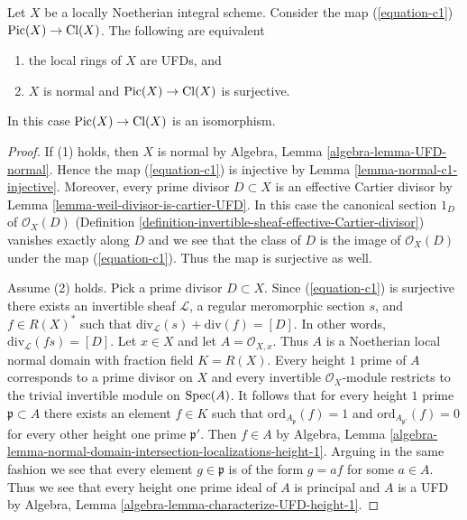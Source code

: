 \begin{lemma}
\label{lemma-local-rings-UFD-c1-bijective}
Let $X$ be a locally Noetherian integral scheme. Consider the map
(\ref{equation-c1}) $\mathop{\mathrm{Pic}}\nolimits(X) \to \text{Cl}(X)$.
The following are equivalent
\begin{enumerate}
\item the local rings of $X$ are UFDs, and
\item $X$ is normal and $\mathop{\mathrm{Pic}}\nolimits(X) \to \text{Cl}(X)$
is surjective.
\end{enumerate}
In this case $\mathop{\mathrm{Pic}}\nolimits(X) \to \text{Cl}(X)$ is an isomorphism.
\end{lemma}

\begin{proof}
If (1) holds, then $X$ is normal by
Algebra, Lemma \ref{algebra-lemma-UFD-normal}.
Hence the map (\ref{equation-c1}) is injective by
Lemma \ref{lemma-normal-c1-injective}. Moreover,
every prime divisor $D \subset X$ is an effective
Cartier divisor by Lemma \ref{lemma-weil-divisor-is-cartier-UFD}.
In this case the canonical section $1_D$ of $\mathcal{O}_X(D)$
(Definition \ref{definition-invertible-sheaf-effective-Cartier-divisor})
vanishes exactly along $D$ and we see that the class of $D$ is the
image of $\mathcal{O}_X(D)$ under the map (\ref{equation-c1}).
Thus the map is surjective as well.

\medskip\noindent
Assume (2) holds. Pick a prime divisor $D \subset X$.
Since (\ref{equation-c1}) is surjective there exists an invertible
sheaf $\mathcal{L}$, a regular meromorphic section $s$, and $f \in R(X)^*$
such that $\text{div}_\mathcal{L}(s) + \text{div}(f) = [D]$.
In other words, $\text{div}_\mathcal{L}(fs) = [D]$.
Let $x \in X$ and let $A = \mathcal{O}_{X, x}$. Thus $A$ is
a Noetherian local normal domain with fraction field $K = R(X)$.
Every height $1$ prime of $A$ corresponds to a prime divisor on $X$
and every invertible $\mathcal{O}_X$-module restricts to the
trivial invertible module on $\mathop{\mathrm{Spec}}(A)$. It follows that for every
height $1$ prime $\mathfrak p \subset A$ there exists an element $f \in K$
such that $\text{ord}_{A_\mathfrak p}(f) = 1$ and
$\text{ord}_{A_{\mathfrak p'}}(f) = 0$ for every other
height one prime $\mathfrak p'$. Then $f \in A$ by Algebra, Lemma
\ref{algebra-lemma-normal-domain-intersection-localizations-height-1}.
Arguing in the same fashion we see that every element $g \in \mathfrak p$
is of the form $g = af$ for some $a \in A$. Thus we see that every
height one prime ideal of $A$ is principal and $A$ is a UFD
by Algebra, Lemma \ref{algebra-lemma-characterize-UFD-height-1}.
\end{proof}







